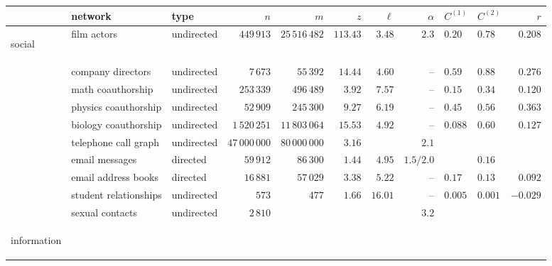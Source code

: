 \begin{center}
\resizebox{16cm}{!} {
\begin{tabular}{l|l|l|r|r|r|r|r|l|l|r|}
 & network                   & type       & $n$             & $m$                & $z$     & $\ell$  & $\alpha$
 & $C^{(1)}$ & $C^{(2)}$ & $r$ \\
\hline
\begin{rotate}{90}
\hbox{\hspace{-7.1em}social}
\end{rotate}
 & film actors               & undirected & $449\,913$      & $25\,516\,482$     & $113.43$& $3.48$  & $2.3$
 & $0.20$  & $0.78$  & $0.208$  \\
 & company directors         & undirected & $7\,673$        & $55\,392$          & $14.44$ & $4.60$  & --
 & $0.59$  & $0.88$  & $0.276$  \\
 & math coauthorship         & undirected & $253\,339$      & $496\,489$         & $3.92$  & $7.57$  & --
 & $0.15$  & $0.34$  & $0.120$  \\
 & physics coauthorship      & undirected & $52\,909$       & $245\,300$         & $9.27$  & $6.19$  & --
 & $0.45$  & $0.56$  & $0.363$  \\
 & biology coauthorship      & undirected & $1\,520\,251$   & $11\,803\,064$     & $15.53$ & $4.92$  & --
 & $0.088$ & $0.60$  & $0.127$  \\
 & telephone call graph      & undirected & $47\,000\,000$  & $80\,000\,000$     & $3.16$  &         & $2.1$
 &         &      &          \\
 & email messages            & directed   & $59\,912$       & $86\,300$          & $1.44$  & $4.95$  & $1.5/2.0$
 &         & $0.16$  &          \\
 & email address books       & directed   & $16\,881$       & $57\,029$          & $3.38$  & $5.22$  & --
 & $0.17$  & $0.13$  & $0.092$  \\
 & student relationships     & undirected & $573$           & $477$              & $1.66$  & $16.01$ & --
 & $0.005$ & $0.001$ & $-0.029$ \\
 & sexual contacts           & undirected & $2\,810$        &                    &         &         & $3.2$
 &         &         &          \\
\hline
\begin{rotate}{90}
\hbox{\hspace{-4.9em}information}
\end{rotate}

\end{tabular}}
\end{center}
